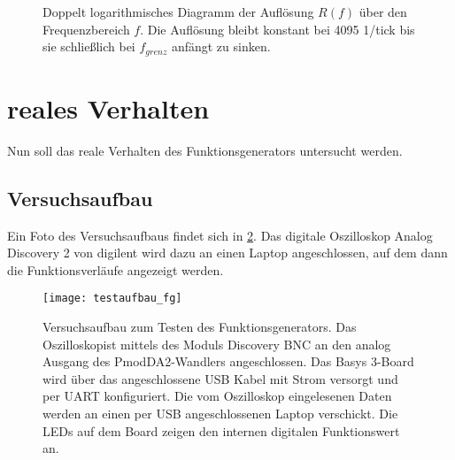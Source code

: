 \begin{figure}[h] \centering
 \caption{Doppelt logarithmisches Diagramm der Auflösung $R(f)$ über den Frequenzbereich $f$. Die Auflösung bleibt konstant bei 4095 1/tick bis sie schließlich bei $f_{grenz}$ anfängt zu sinken.} \label{test:theo:res:plot}
\end{figure}

\section{reales Verhalten}
Nun soll das reale Verhalten des Funktionsgenerators untersucht werden.

\subsection{Versuchsaufbau}
Ein Foto des Versuchsaufbaus findet sich in \cref{test:real:setup:pic}.
Das digitale Oszilloskop Analog Discovery 2 von digilent wird dazu an einen Laptop angeschlossen, auf dem dann die Funktionsverläufe angezeigt werden.

\begin{figure}[h]
  \texttt{[image: testaufbau\_fg]}
  \caption{Versuchsaufbau zum Testen des Funktionsgenerators. Das Oszilloskopist mittels des Moduls Discovery BNC an den analog Ausgang des PmodDA2-Wandlers angeschlossen. Das Basys 3-Board wird über das angeschlossene USB Kabel mit Strom versorgt und per UART konfiguriert. Die vom Oszilloskop eingelesenen Daten werden an einen per USB angeschlossenen Laptop verschickt. Die LEDs auf dem Board zeigen den internen digitalen Funktionswert an.} \label{test:real:setup:pic}
\end{figure}

